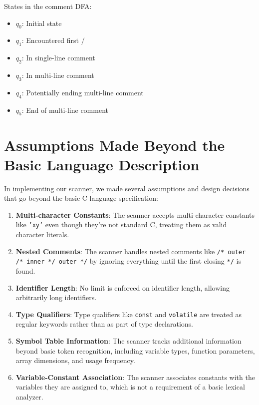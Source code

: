 \documentclass[12pt]{article}
\begin{document}
States in the comment DFA:
\begin{itemize}
    \item $q_0$: Initial state
    \item $q_1$: Encountered first /
    \item $q_2$: In single-line comment
    \item $q_3$: In multi-line comment
    \item $q_4$: Potentially ending multi-line comment
    \item $q_5$: End of multi-line comment
\end{itemize}

\section{Assumptions Made Beyond the Basic Language Description}

In implementing our scanner, we made several assumptions and design decisions that go beyond the basic C language specification:

\begin{enumerate}
    \item \textbf{Multi-character Constants}: The scanner accepts multi-character constants like \texttt{'xy'} even though they're not standard C, treating them as valid character literals.
    
    \item \textbf{Nested Comments}: The scanner handles nested comments like \texttt{/* outer /* inner */ outer */} by ignoring everything until the first closing \texttt{*/} is found.
    
    \item \textbf{Identifier Length}: No limit is enforced on identifier length, allowing arbitrarily long identifiers.
    
    \item \textbf{Type Qualifiers}: Type qualifiers like \texttt{const} and \texttt{volatile} are treated as regular keywords rather than as part of type declarations.
    
    \item \textbf{Symbol Table Information}: The scanner tracks additional information beyond basic token recognition, including variable types, function parameters, array dimensions, and usage frequency.
    
    \item \textbf{Variable-Constant Association}: The scanner associates constants with the variables they are assigned to, which is not a requirement of a basic lexical analyzer.
\end{enumerate}
\end{document}

